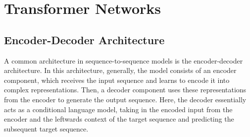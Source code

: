 \documentclass[11pt,twoside]{article}
\begin{document}





{
\setlength{\parskip}{0.35em} 
\tableofcontents
}
\newpage






\section{Transformer Networks}

\subsection{Encoder-Decoder Architecture}
A common architecture in sequence-to-sequence models is the encoder-decoder architecture. In this architecture, generally, the model consists of an encoder component, which receives the input sequence and learns to encode it into complex representations. Then, a decoder component uses these representations from the encoder to generate the output sequence. Here, the decoder essentially acts as a conditional language model, taking in the encoded input from the encoder and the leftwards context of the target sequence and predicting the subsequent target sequence. 
\end{document}
